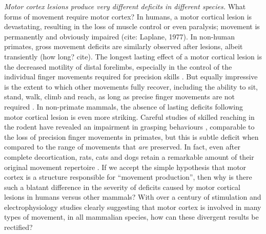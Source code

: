\emph{Motor cortex lesions produce very different deficits in different species.}
What forms of movement require motor cortex? In humans, a motor cortical lesion is devastating, resulting in the loss of muscle control or even paralysis; movement is permanently and obviously impaired (cite: Laplane, 1977). In non-human primates, gross movement deficits are similarly observed after lesions, albeit transiently (how long? cite). The longest lasting effect of a motor cortical lesion is the decreased motility of distal forelimbs, especially in the control of the individual finger movements required for precision skills \cite{Leyton1917,Darling2011}. But equally impressive is the extent to which other movements fully recover, including the ability to sit, stand, walk, climb and reach, as long as precise finger movements are not required \cite{Leyton1917,Darling2011}. In non-primate mammals, the absence of lasting deficits following motor cortical lesion is even more striking. Careful studies of skilled reaching in the rodent have revealed an impairment in grasping behaviours \cite{Alaverdashvili2008a}, comparable to the loss of precision finger movements in primates, but this is subtle deficit when compared to the range of movements that \emph{are} preserved. In fact, even after complete decortication, rats, cats and dogs retain a remarkable amount of their original movement repertoire \cite{Bjursten1976,Terry1989}. If we accept the simple hypothesis that motor cortex is a structure responsible for ``movement production'', then why is there such a blatant difference in the severity of deficits caused by motor cortical lesions in humans versus other mammals? With over a century of stimulation and electrophysiology studies clearly suggesting that motor cortex is involved in many types of movement, in all mammalian species, how can these divergent results be rectified?

